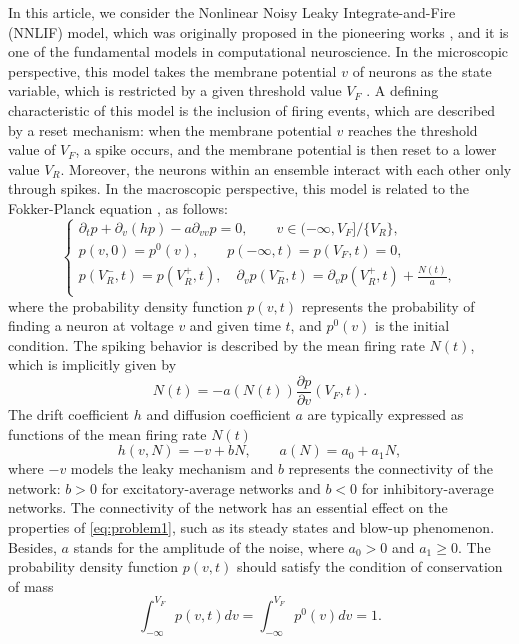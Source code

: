 In this article, we consider the Nonlinear Noisy Leaky Integrate-and-Fire (NNLIF)  model, which was originally proposed in the pioneering works \cite{brunel1999fast}\cite{brunel2000dynamics}, and it is one of the fundamental models in computational neuroscience. In the microscopic perspective, this model takes the membrane potential $v$ of neurons as the state variable, which is restricted by a given threshold value $V_F$ \cite{renart2004mean}\cite{sirovich2006dynamics}\cite{omurtag2000simulation}\cite{mattia2002population}. A defining characteristic of this model is the inclusion of firing events, which are described by a reset mechanism: when the membrane potential $v$ reaches the threshold value of $V_F$, a spike occurs, and the membrane potential is then reset to a lower value $V_R$. Moreover, the neurons within an ensemble interact with each other only through spikes. In the macroscopic perspective, this model is related to the Fokker-Planck equation \cite{nykamp2000population}\cite{liu2022rigorous}\cite{Liu2021investigating}, as follows:
\begin{equation}
    \label{eq:problem1}
    \begin{cases}
        \partial_{t}p+\partial_{v}(hp)-a\partial_{v v}p=0,\qquad v\in(-\infty,V_F]/\{V_R\},\\
        p(v,0)=p^0(v),\qquad p(-\infty,t)=p(V_F,t)=0,\\
        p(V^-_R,t)=p(V^+_R,t),\quad \partial _vp(V^-_R,t)=\partial _vp(V^+_R,t)+\frac{N(t)}{a},\\
    \end{cases}
\end{equation}
where the probability density function $p(v,t)$ represents the probability of finding a neuron at voltage $v$ and given time $t$, and $p^0(v)$ is the initial condition. The spiking behavior is described by the mean firing rate $N (t)$, which is implicitly given by
\begin{equation}
    \label{eq:Nt}
    N(t)=-a(N(t))\frac{\partial p}{\partial v}(V_F,t).
\end{equation}
The drift coefficient $h$ and diffusion coefficient $a$ are typically expressed as functions of the mean firing rate $N(t)$
\begin{equation}
    \label{eq:ha}
    h(v,N)=-v+bN,\qquad a(N)=a_0+a_1N,
\end{equation}
where $-v$ models the leaky mechanism and $b$ represents the connectivity of the network: $b > 0$ for excitatory-average networks and $b < 0$ for inhibitory-average networks. The connectivity of the network has an essential effect on the properties of \eqref{eq:problem1}, such as its steady states and blow-up phenomenon. Besides, $a$ stands for the amplitude of the noise, where $a_0 > 0$ and $a_1 \geq 0$. 
The probability density function $p(v, t)$  should satisfy the condition of conservation of mass
\begin{equation}
    \int_{-\infty}^{V_{F}} p(v, t) d v=\int_{-\infty}^{V_{F}} p^{0}(v) d v=1.
\end{equation}


